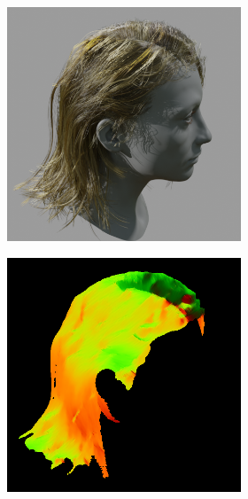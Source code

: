 \documentclass[12pt]{article}
\begin{document}
\begin{figure}[h]
    \centering
    \begin{subfigure}{0.48\textwidth}
        \centering
        \begin{subfigure}{0.48\textwidth}
            \centering
            \includegraphics[width=\textwidth]{./images/baseline-method/test_6_rendered.png}
        \end{subfigure}
        \hfill
        \begin{subfigure}{0.48\textwidth}
            \centering
            \includegraphics[width=\textwidth]{./images/baseline-method/test_6_hairstep.jpg}

\end{subfigure}
\end{subfigure}
\end{figure}
\end{document}

